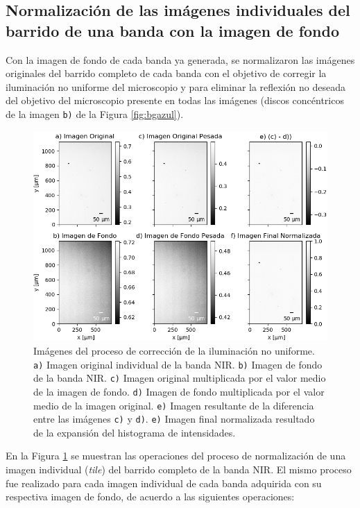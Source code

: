 \singlespacing
\subsection{Normalización de las imágenes individuales del barrido de una banda con la imagen de fondo \href{https://github.com/jrr1984/defects_analysis/blob/master/bg_normalization.py}{\faGithub}}
\label{subs:nm}

\hspace{0.5cm} Con la imagen de fondo de cada banda ya generada, se normalizaron las imágenes originales del barrido completo de cada banda\cite{Nordenfelt} con el objetivo de corregir la iluminación no uniforme del microscopio y para eliminar la reflexión no deseada del objetivo del microscopio presente en todas las imágenes (discos concéntricos de la imagen \texttt{b)} de la Figura \ref{fig:bgazul}).
\begin{figure}[H]
	\centering
\includegraphics[scale=0.98]{Figs/defectosZEISS/correccionilum/NIR/1.png}
\caption{Imágenes del proceso de corrección de la iluminación no uniforme. \texttt{a)} Imagen original individual de la banda NIR. \texttt{b)} Imagen de fondo de la banda NIR. \texttt{c)} Imagen original multiplicada por el valor medio de la imagen de fondo. \texttt{d)} Imagen de fondo multiplicada por el valor medio de la imagen original. \texttt{e)} Imagen resultante de la diferencia entre las imágenes \texttt{c)} y \texttt{d)}. \texttt{e)} Imagen final normalizada resultado de la expansión del histograma de intensidades.}
\label{fig:correcilumims}
\end{figure}	
 En la Figura \ref{fig:correcilumims} se muestran las operaciones del proceso de normalización de una imagen individual (\textit{tile}) del barrido completo de la banda NIR. El mismo proceso fue realizado para cada imagen individual de cada banda adquirida con su respectiva imagen de fondo, de acuerdo a las siguientes operaciones:
